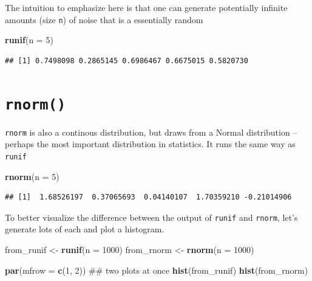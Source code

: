 \documentclass[]{book}
\newenvironment{Shaded}{\begin{snugshade}}{\end{snugshade}}
\newcommand{\KeywordTok}[1]{\textcolor[rgb]{0.13,0.29,0.53}{\textbf{#1}}}
\newcommand{\DataTypeTok}[1]{\textcolor[rgb]{0.13,0.29,0.53}{#1}}
\newcommand{\DecValTok}[1]{\textcolor[rgb]{0.00,0.00,0.81}{#1}}
\newcommand{\StringTok}[1]{\textcolor[rgb]{0.31,0.60,0.02}{#1}}
\newcommand{\NormalTok}[1]{#1}
\theoremstyle{definition}
\theoremstyle{definition}
\theoremstyle{definition}
\theoremstyle{remark}
\begin{document}
The intuition to emphasize here is that one can generate potentially
infinite amounts (size \texttt{n}) of noise that is a essentially random

\begin{Shaded}
\begin{Highlighting}[]
\KeywordTok{runif}\NormalTok{(}\DataTypeTok{n =} \DecValTok{5}\NormalTok{)}
\end{Highlighting}
\end{Shaded}

\begin{verbatim}
## [1] 0.7498098 0.2865145 0.6986467 0.6675015 0.5820730
\end{verbatim}

\section{\texorpdfstring{\texttt{rnorm()}}{rnorm()}}\label{rnorm}

\texttt{rnorm} is also a continous distribution, but draws from a Normal
distribution -- perhaps the most important distribution in statistics.
It runs the same way as \texttt{runif}

\begin{Shaded}
\begin{Highlighting}[]
\KeywordTok{rnorm}\NormalTok{(}\DataTypeTok{n =} \DecValTok{5}\NormalTok{)}
\end{Highlighting}
\end{Shaded}

\begin{verbatim}
## [1]  1.68526197  0.37065693  0.04140107  1.70359210 -0.21014906
\end{verbatim}

To better visualize the difference between the output of \texttt{runif}
and \texttt{rnorm}, let's generate lots of each and plot a histogram.

\begin{Shaded}
\begin{Highlighting}[]
\NormalTok{from_runif <-}\StringTok{ }\KeywordTok{runif}\NormalTok{(}\DataTypeTok{n =} \DecValTok{1000}\NormalTok{)}
\NormalTok{from_rnorm <-}\StringTok{ }\KeywordTok{rnorm}\NormalTok{(}\DataTypeTok{n =} \DecValTok{1000}\NormalTok{)}

\KeywordTok{par}\NormalTok{(}\DataTypeTok{mfrow =} \KeywordTok{c}\NormalTok{(}\DecValTok{1}\NormalTok{, }\DecValTok{2}\NormalTok{)) ## two plots at once}
\KeywordTok{hist}\NormalTok{(from_runif)}
\KeywordTok{hist}\NormalTok{(from_rnorm)}
\end{Highlighting}
\end{Shaded}
\end{document}
